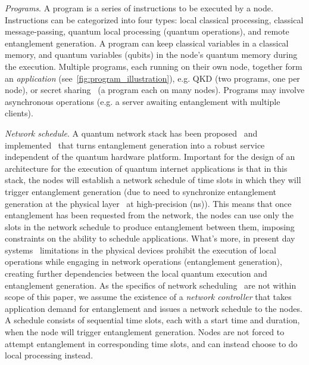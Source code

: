 \textit{Programs}.
A program is a series of instructions to be executed by a node.
Instructions can be categorized into four types: local classical processing, classical message-passing, quantum local processing (quantum operations), and remote entanglement generation.
A program can keep classical variables in a classical memory, and quantum variables (qubits) in the node's quantum memory during the execution.
Multiple programs, each running on their own node, together form an \textit{application} (see~\ref{fig:program_illustration}), e.g. QKD (two programs, one per node),
or secret sharing~\cite{hillery1999quantum} (a program each on many nodes).
Programs may involve asynchronous operations (e.g. a server awaiting entanglement with multiple clients).

\textit{Network schedule}.
A quantum network stack has been proposed~\cite{dahlberg2019link} and implemented~\cite{pompili2022experimental} that turns entanglement generation into a robust service independent of the quantum hardware platform.
Important for the design of an architecture for the execution of quantum internet applications is that in this stack, the nodes will establish a network schedule of time slots in which they will trigger entanglement generation (due to need to synchronize entanglement generation at the physical layer~\cite{dahlberg2019link} at high-precision (ns)).
This means that once entanglement has been requested from the network, the nodes can use only the slots in the network schedule to produce entanglement between them, imposing constraints on the ability to schedule applications. What's more, in present day systems~\cite{pompili2021realization, krutyanskiy2023entanglement} limitations in the physical devices prohibit the execution of local operations while engaging in network operations (entanglement generation), creating further dependencies between the local quantum execution and entanglement generation. 
As the specifics of network scheduling~\cite{network-scheduling, skrzypczyk2021architecture} are not within scope of this paper,
we assume the existence of a \textit{network controller} that takes application demand for entanglement and issues a network schedule to the nodes. 
A schedule consists of sequential time slots, each with a start time and duration, when the node will trigger entanglement generation.
Nodes are not forced to attempt entanglement in corresponding time slots, and can instead choose to do local processing instead.


